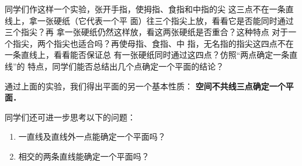 同学们作这样一个实验，张开手指，使拇指、食指和中指的尖
这三点不在一条直线上，拿一张硬纸（它代表一个平
面）往三个指尖上放，看看它是否能同时通过三个指尖？再
拿一张硬纸仍然这样放，看这两张硬纸是否重合？这种特点
对于一个指尖，两个指尖也适合吗？再使母指、食指、中
指，无名指的指尖这四点不在一条直线上，看看能否保证总
有一张硬纸同时通过这四点？仿照“两点确定一条直线”的
特点，同学们能否总结出几个点确定一个平面的结论？

通过上面的实验，我们得出平面的另一个基本性质：
\textbf{空间不共线三点确定一个平面．}

同学们还可进一步思考以下的问题：
\begin{enumerate}
	\item 一直线及直线外一点能确定一个平面吗？
	\item 相交的两条直线能确定一个平面吗？
\end{enumerate}

